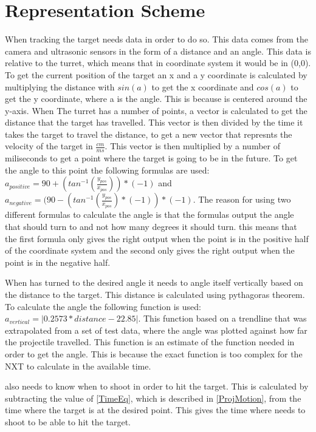 \chapter{Representation Scheme}
When tracking the target \name needs data in order to do so. This data comes
from the camera and ultrasonic sensors in the form of a distance and an angle.
This data is relative to the turret, which means that in coordinate system it
would be in (0,0). To get the current position of the target an x and a y
coordinate is calculated by multiplying the distance with $sin(a)$ to get the x coordinate and
$cos(a)$ to get the y coordinate, where a is the angle. This is because \name is
centered around the y-axis. When The turret has a number of points, a vector is
calculated to get the distance that the target has travelled. This vector is
then divided by the time it takes the target to travel the distance, to get a new vector that represnts the
velocity of the target in $\frac{cm}{ms}$. This vector is then multiplied by a
number of miliseconds to get a point where the target is going to be in the
future. To get the angle to this point the following formulas are used:
$a_{positive}=90+(tan^{-1}(\frac{y_{pos}}{x_{pos}}))*(-1)$ and
$a_{negative}=(90-(tan^{-1}(\frac{y_{pos}}{x_{pos}})*(-1))*(-1)$. The reason for
using two different formulas to calculate the angle is that the formulas output
the angle that \name should turn to and not how many degrees it should turn.
this means that the first formula only gives the right output when the point is
in the positive half of the coordinate system and the second only gives the
right output when the point is in the negative half.\nl


When \name has turned to the desired angle it needs to angle itself vertically
based on the distance to the target. This distance is calculated using
pythagoras theorem. To calculate the angle the following function is used:\\
$a_{vertical}=| 0.2573*distance-22.85 |$.
This function based on a trendline that was extrapolated from a set of test
data, where the angle was plotted against how far the projectile travelled. This
function is an estimate of the function needed in order to get the angle. This
is because the exact function is too complex for the NXT to calculate in the available time.\nl
 
\name also needs to know when to shoot in order to hit the target.
This is calculated by subtracting the value of \autoref{TimeEq}, which is described in
\autoref{ProjMotion}, from the time where the target is at the desired point.
This gives the time where \name needs to shoot to be able to hit the target.
